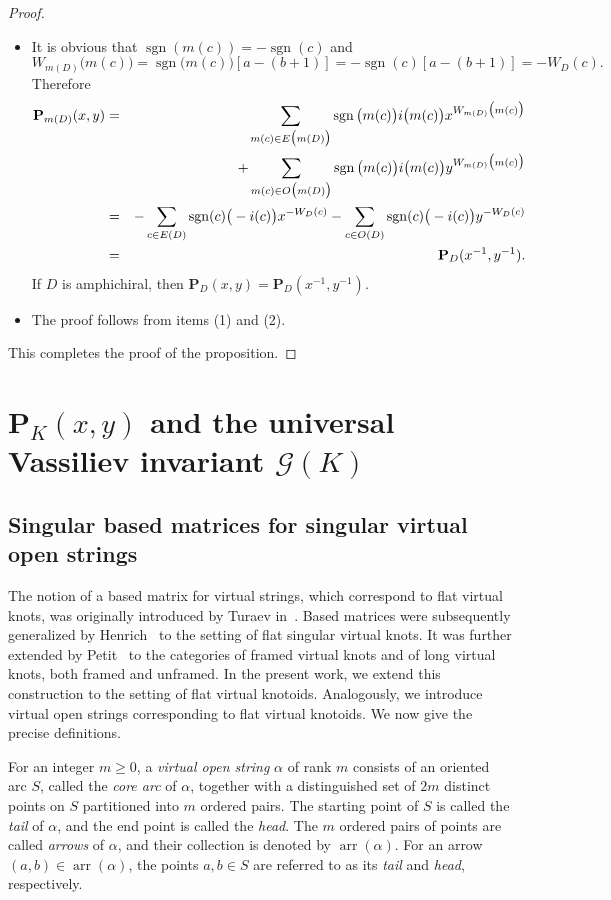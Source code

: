 \documentclass[12pt]{amsart}
\theoremstyle{noparens}
\numberwithin{equation}{section}
\numberwithin{equation}{section}
\begin{document}
\begin{proof}
\begin{itemize}
		\item[(2)] It is obvious that $\operatorname{sgn}(m(c))=-\operatorname{sgn}(c)$ and
		$$ 
		W_{m(D)}\big(m(c)\big) =  \operatorname{sgn}\big(m(c)\big)[a-(b+1)]  
		=  -\operatorname{sgn} ( c )[a-(b+1)]  
		=   -W_{D} (c).
		$$
		Therefore 
		\begin{eqnarray*}
			\mathbf{P}_{m(D)}(x,y) & = &  \sum_{m(c) \in E\big(m(D)\big)} \operatorname{sgn}\big(m(c)\big) i\big(m(c)\big) x^{W_{m(D)}\big(m(c)\big)}\\ &&+ \sum_{m(c) \in O\big(m(D)\big)} \operatorname{sgn}\big(m(c)\big) i\big(m(c)\big) y^{W_{m(D)}\big(m(c)\big)} \cr 
			& = & - \sum_{c \in E(D)} \operatorname{sgn}(c) \big(-i(c)\big) x^{-W_D(c)} - \sum_{c \in O(D)} \operatorname{sgn}(c) \big(-i(c)\big) y^{-W_D(c)} \\ &=& \mathbf{P}_{D}(x^{-1},y^{-1}).
		\end{eqnarray*}    
		If $D$ is amphichiral, then $\mathbf{P}_D (x,y)=\mathbf{P}_D (x^{-1},y^{-1})$.
		\item[(3)] The proof follows from items (1) and (2). 
	\end{itemize}	
	This completes the proof of the proposition.
\end{proof} 

\section{$\mathbf{P}_K(x,y)$ and the universal Vassiliev invariant $\mathcal G(K)$ } \label{section4}

\subsection{Singular based matrices for singular virtual open strings} \label{subsection4.1}

The notion of a based matrix for virtual strings, which correspond to flat virtual knots, was originally introduced by Turaev in~\cite{Tur2}.  Based matrices were subsequently generalized by Henrich~\cite{Hen} to the setting of flat singular virtual knots. It was further extended by Petit~\cite{Pet} to the categories of framed virtual knots and of long virtual knots, both framed and unframed. In the present work, we extend this construction to the setting of flat virtual knotoids. Analogously, we introduce virtual open strings corresponding to flat virtual knotoids. We now give the precise definitions.

For an integer $m \geq 0$, a \textit{virtual open string} $\alpha$ of rank $m$ consists of an oriented arc $S$, called the \textit{core arc} of $\alpha$, together with a distinguished set of $2m$ distinct points on $S$ partitioned into $m$ ordered pairs. The starting point of $S$ is called the \textit{tail} of $\alpha$, and the end point is called the \textit{head}. The $m$ ordered pairs of points are called \textit{arrows} of $\alpha$, and their collection is denoted by $\operatorname{arr}(\alpha)$. For an arrow $(a,b) \in \operatorname{arr}(\alpha)$, the points $a,b \in S$ are referred to as its \textit{tail} and \textit{head}, respectively.
\end{document}
